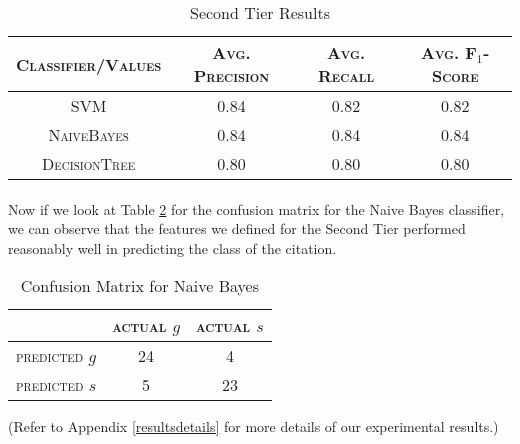 \begin{table}[h]
	\center
	\begin{tabular}{ c | c  c  c }
		\textsc{Classifier/Values} & \textsc{Avg. Precision} & \textsc{Avg. Recall} & \textsc{Avg. F$_1$-Score} \\
		\hline
		\textsc{SVM} 			& 0.84 & 0.82 & 0.82 \\
		\textsc{NaiveBayes} 	& 0.84 & 0.84 & 0.84 \\
		\textsc{DecisionTree}	& 0.80 & 0.80 & 0.80
	\end{tabular}
	\caption{Second Tier Results}
	\label{tab:secondtieresults}
\end{table}
\newpage
\paragraph{}
Now if we look at Table \ref{tab:naivebayesconfusionmatrix} for the confusion matrix for the Naive Bayes classifier, we can observe that the features we defined for the Second Tier performed reasonably well in predicting the class of the citation. 

\begin{table}[h]
	\center
	\begin{tabular}{ c | c  c }
		 & \textsc{actual $g$} & \textsc{actual $s$} \\
		\hline
		\textsc{predicted $g$} 	& 24 & 4 \\
		\textsc{predicted $s$}		& 5 & 23
	\end{tabular}
	\caption{Confusion Matrix for Naive Bayes}
	\label{tab:naivebayesconfusionmatrix}
\end{table}

(Refer to Appendix \ref{resultsdetails} for more details of our experimental results.)